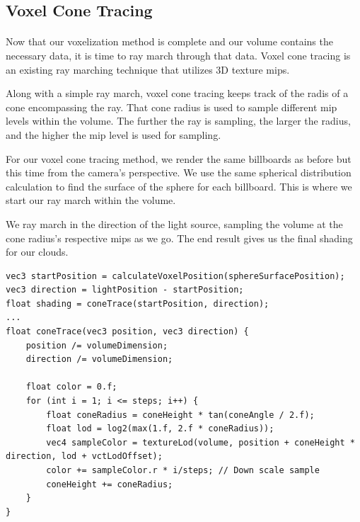 \newpage
\subsection{Voxel Cone Tracing}\paragraph{}
Now that our voxelization method is complete and our volume contains the necessary data, it is time to ray march through that data. Voxel cone tracing is an existing ray marching technique that utilizes 3D texture mips.

Along with a simple ray march, voxel cone tracing keeps track of the radis of a cone encompassing the ray. That cone radius is used to sample different mip levels within the volume. The further the ray is sampling, the larger the radius, and the higher the mip level is used for sampling. 


For our voxel cone tracing method, we render the same billboards as before but this time from the camera's perspective. We use the same spherical distribution calculation to find the surface of the sphere for each billboard. This is where we start our ray march within the volume. 

We ray march in the direction of the light source, sampling the volume at the cone radius's respective mips as we go. The end result gives us the final shading for our clouds. 
\begin{lstlisting}[caption={conetrace\_frag.glsl, 63}]
vec3 startPosition = calculateVoxelPosition(sphereSurfacePosition);
vec3 direction = lightPosition - startPosition;
float shading = coneTrace(startPosition, direction);
...
float coneTrace(vec3 position, vec3 direction) {
    position /= volumeDimension;
    direction /= volumeDimension;

    float color = 0.f;
    for (int i = 1; i <= steps; i++) {
        float coneRadius = coneHeight * tan(coneAngle / 2.f);
        float lod = log2(max(1.f, 2.f * coneRadius));
        vec4 sampleColor = textureLod(volume, position + coneHeight * direction, lod + vctLodOffset);
        color += sampleColor.r * i/steps; // Down scale sample
        coneHeight += coneRadius;
    }
}
\end{lstlisting}\paragraph{}


